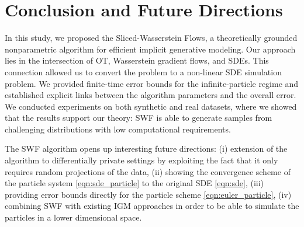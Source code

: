 
\section{Conclusion and Future Directions}

In this study, we proposed the Sliced-Wasserstein Flows, a theoretically grounded nonparametric algorithm for efficient implicit generative modeling. 
Our approach lies in the intersection of OT, Wasserstein gradient flows, and SDEs. This connection allowed us to convert the problem to a non-linear SDE simulation problem. We provided finite-time error bounds for the infinite-particle regime and established explicit links between the algorithm parameters and the overall error. We conducted experiments on both synthetic and real datasets, where we showed that the results support our theory: SWF is able to generate samples from challenging distributions with low computational requirements. 

The SWF algorithm opens up interesting future directions: (i) extension of the algorithm to differentially private settings \cite{dwork2014algorithmic} by exploiting the fact that it only requires random projections of the data, (ii) showing the convergence scheme of the particle system \eqref{eqn:sde_particle} to the original SDE \eqref{eqn:sde}, (iii) providing error bounds directly for the particle scheme \eqref{eqn:euler_particle}, (iv) combining SWF with existing IGM approaches in order to be able to simulate the particles in a lower dimensional space.  
 